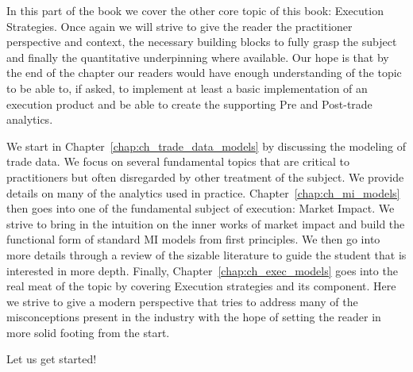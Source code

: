 
In this part of the book we cover the other core topic of this book: Execution Strategies. Once again we will strive to give the reader the practitioner perspective and context, the necessary building blocks to fully grasp the subject and finally the quantitative underpinning where available.  Our hope is that by the end of the chapter our readers would have enough understanding of the topic to be able to, if asked, to implement at least a basic implementation of an execution product and be able to create the supporting Pre and Post-trade analytics.


We start in Chapter~\ref{chap:ch_trade_data_models} by discussing the modeling of trade data. We focus on several fundamental topics that are critical to practitioners but often disregarded by other treatment of the subject. We provide details on many of the analytics used in practice. Chapter~\ref{chap:ch_mi_models} then goes into one of the fundamental subject of execution: Market Impact. We strive to bring in the intuition on the inner works of market impact and build the functional form of standard MI models from first principles. We then go into more details through a review of the sizable literature to guide the student that is interested in more depth. Finally, Chapter~\ref{chap:ch_exec_models} goes into the real meat of the topic by covering Execution strategies and its component. Here we strive to give a modern perspective that tries to address many of the misconceptions present in the industry with the hope of setting the reader in more solid footing from the start.


Let us get started!